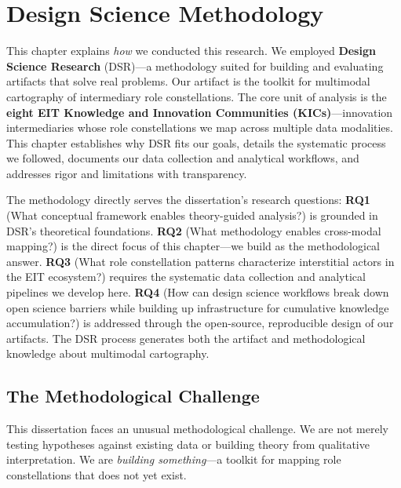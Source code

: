\documentclass[../main.tex]{subfiles}
\begin{document}
\chapter{Design Science Methodology}
\margintoc

\begin{chapteroverview}
This chapter explains \textit{how} we conducted this research. We employed \textbf{Design Science Research} (DSR)---a methodology suited for building and evaluating artifacts that solve real problems. Our artifact is the \RoleBox toolkit for multimodal cartography of intermediary role constellations. The core unit of analysis is the \textbf{eight EIT Knowledge and Innovation Communities (KICs)}---innovation intermediaries whose role constellations we map across multiple data modalities. This chapter establishes why DSR fits our goals, details the systematic process we followed, documents our data collection and analytical workflows, and addresses rigor and limitations with transparency.

The methodology directly serves the dissertation's research questions: \textbf{RQ1} (What conceptual framework enables theory-guided analysis?) is grounded in DSR's theoretical foundations. \textbf{RQ2} (What methodology enables cross-modal mapping?) is the direct focus of this chapter---we build \RoleBox{} as the methodological answer. \textbf{RQ3} (What role constellation patterns characterize interstitial actors in the EIT ecosystem?) requires the systematic data collection and analytical pipelines we develop here. \textbf{RQ4} (How can design science workflows break down open science barriers while building up infrastructure for cumulative knowledge accumulation?) is addressed through the open-source, reproducible design of our artifacts. The DSR process generates both the artifact and methodological knowledge about multimodal cartography.
\end{chapteroverview}


\section{The Methodological Challenge}

This dissertation faces an unusual methodological challenge. We are not merely testing hypotheses against existing data or building theory from qualitative interpretation. We are \textit{building something}---a toolkit for mapping role constellations that does not yet exist.
\end{document}
